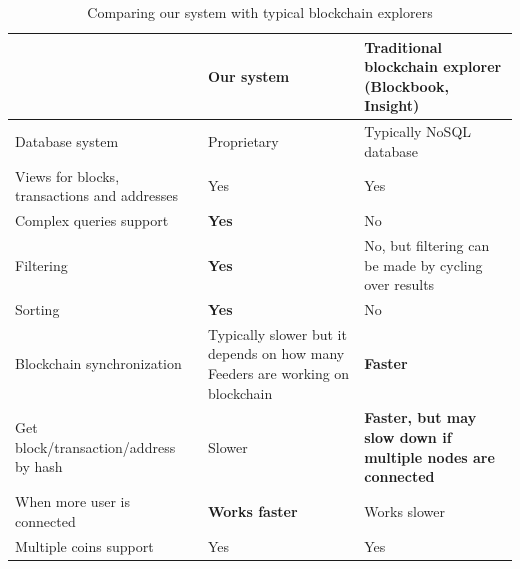 \begin{table}
    \centering
    \begin{tabular}{| p{} | p{} | p{} |}
    \hline
    & \textbf{Our system}                                                                    & \textbf{Traditional blockchain explorer (Blockbook, Insight)}      \\ \hline
    Database system               & Proprietary                                                                         & Typically NoSQL database                                                        \\ \hline
    Views for blocks, transactions and addresses               & Yes                                                                         & Yes                                                        \\ \hline
    Complex queries support               & \textbf{Yes}                                                                         & No                                                        \\ \hline
    Filtering                             & \textbf{Yes}                                                                         & No, but filtering can be made by cycling over results     \\ \hline
    Sorting                               & \textbf{Yes}                                                                         & No                                                        \\ \hline
    Blockchain synchronization            & Typically slower but it depends on how many Feeders are working on blockchain & \textbf{Faster}                                                    \\ \hline
    Get block/transaction/address by hash & Slower                                                                        & \textbf{Faster, but may slow down if multiple nodes are connected} \\ \hline
    When more user is connected           & \textbf{Works faster}                                                                  & Works slower                                              \\ \hline
    Multiple coins support                & Yes                                                                          & Yes                                                \\ \hline
    \end{tabular}
    \caption{Comparing our system with typical blockchain explorers}
    \label{comparingTable}
\end{table}

